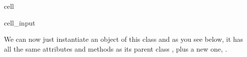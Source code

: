\documentclass[letterpaper,10pt,english]{jupyterBook}
\begin{document}
\begin{sphinxuseclass}{cell}\begin{sphinxVerbatimInput}

\begin{sphinxuseclass}{cell_input}
\begin{sphinxVerbatim}[commandchars=\\\{\}]
 
       
      
                  
              
\end{sphinxVerbatim}

\end{sphinxuseclass}\end{sphinxVerbatimInput}

\end{sphinxuseclass}
\sphinxAtStartPar
We can now just instantiate an object of this class and as you see below, it has all the same attributes and methods as its parent class , plus a new one, .
\end{document}
